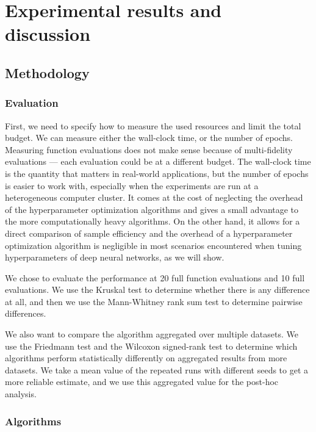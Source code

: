 \chapter{Experimental results and discussion}

\section{Methodology}

\subsection{Evaluation}

First, we need to specify how to measure the used resources and limit the total budget. We can measure either the wall-clock time, or the number of epochs. Measuring function evaluations does not make sense because of multi-fidelity evaluations --- each evaluation could be at a different budget. The wall-clock time is the quantity that matters in real-world applications, but the number of epochs is easier to work with, especially when the experiments are run at a heterogeneous computer cluster. It comes at the cost of neglecting the overhead of the hyperparameter optimization algorithms and gives a small advantage to the more computationally heavy algorithms. On the other hand, it allows for a direct comparison of sample efficiency and the overhead of a hyperparameter optimization algorithm is negligible in most scenarios encountered when tuning hyperparameters of deep neural networks, as we will show.

We chose to evaluate the performance at 20 full function evaluations and 10 full evaluations. We use the Kruskal test to determine whether there is any difference at all, and then we use the Mann-Whitney rank sum test to determine pairwise differences.

We also want to compare the algorithm aggregated over multiple datasets. We use the Friedmann test and the Wilcoxon signed-rank test to determine which algorithms perform statistically differently on aggregated results from more datasets. We take a mean value of the repeated runs with different seeds to get a more reliable estimate, and we use this aggregated value for the post-hoc analysis.

\subsection{Algorithms}

